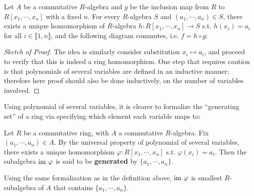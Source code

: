 \documentclass{article}
\begin{document}
\begin{theorem}
    Let $A$ be a commutative $R$-algebra and $g$ be the inclusion map from $R$ to $R[x_1, \cdots, x_n]$ with a fixed $n$. For every $R$-algebra $S$ and $(a_1, \cdots, a_n)\in S$, there exists a unique homomorphism of $R$-algebra $h: R[x_1, \cdots, x_n] \to S$ s.t. $h(x_i) = a_i$ for all $i\in \llbracket 1, n \rrbracket$, and the following diagram commutes, i.e. $f = h\circ g$:
    \begin{figure}[htbp]
        \centering
    \end{figure}
\end{theorem}

\begin{proof}[Sketch of Proof]
    The idea is similarly consider substitution $x_i \mapsto a_i$, and proceed to verify that this is indeed a ring homomorphism. One step that requires caution is that polynomials of several variables are defined in an inductive manner; therefore here proof should also be done inductively, on the number of variables involved. 
\end{proof}

Using polynomial of several variables, it is clearer to formalize the ``generating set'' of a ring via specifying which element each variable maps to:

\begin{definition}
    Let $R$ be a commutative ring, with $A$ a commutative $R$-algebra. Fix $(a_1, \cdots, a_n)\in A$. By the universal property of polynomial of several variables, there exists a unique homomorphism $\varphi: R[x_1, \cdots, x_n]$ s.t. $\varphi(x_i) = a_i$. Then the subalgebra $\mathrm{im}\  \varphi$ is said to be \textbf{generated} by $\{a_1, \cdots, a_n\}$. 
\end{definition}

\begin{remark}
    Using the same formalization as in the definition above, $\mathrm{im}\  \varphi$ is smallest $R$-subalgebra of $A$ that contains $\{ a_1, \cdots, a_n \}$. 
\end{remark}
\end{document}
